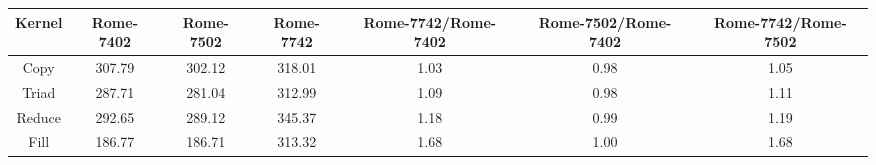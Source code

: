 \begin{tabular}{|c|c|c|c|c|c|c|}  \hline
Kernel&Rome-7402&Rome-7502&Rome-7742 & Rome-7742/Rome-7402 & Rome-7502/Rome-7402 & Rome-7742/Rome-7502 \\ \hline 
Copy & 307.79 & 302.12 & 318.01  & 1.03 & 0.98 & 1.05 \\ \hline 
Triad & 287.71 & 281.04 & 312.99  & 1.09 & 0.98 & 1.11 \\ \hline 
Reduce & 292.65 & 289.12 & 345.37  & 1.18 & 0.99 & 1.19 \\ \hline 
Fill & 186.77 & 186.71 & 313.32  & 1.68 & 1.00 & 1.68 \\ \hline 
\end{tabular}
